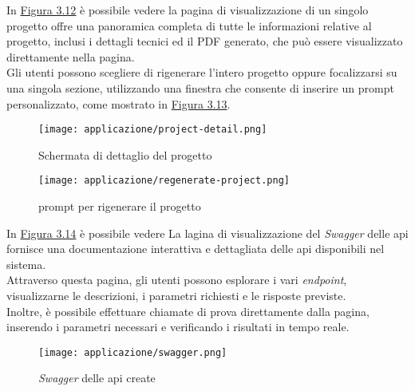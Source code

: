 \pagebreak
\noindent In {\hyperref[fig:project-detail]{Figura 3.12}} è possibile vedere la pagina di visualizzazione di un singolo progetto offre una panoramica completa di tutte le informazioni relative al progetto, inclusi i dettagli tecnici ed il PDF generato, che può essere visualizzato direttamente nella pagina. \\ 
Gli utenti possono scegliere di rigenerare l’intero progetto oppure focalizzarsi su una singola sezione, utilizzando una finestra che consente di inserire un \gls{prompt} personalizzato, come mostrato in {\hyperref[fig:regenerate-project]{Figura 3.13}}.\\
\begin{figure}[H]
    \centering
    \texttt{[image: applicazione/project-detail.png]}
    \caption{Schermata di dettaglio del progetto}
    \label{fig:project-detail}
\end{figure}

\begin{figure}[H]
    \centering
    \texttt{[image: applicazione/regenerate-project.png]}
    \caption{\gls{prompt} per rigenerare il progetto}
    \label{fig:regenerate-project}
\end{figure}

\pagebreak
\noindent In {\hyperref[fig:swagger]{Figura 3.14}} è possibile vedere La lagina di visualizzazione del \textit{Swagger} delle \gls{api} fornisce una documentazione interattiva e dettagliata delle \gls{api} disponibili nel sistema. \\
Attraverso questa pagina, gli utenti possono esplorare i vari \textit{endpoint}, visualizzarne le descrizioni, i parametri richiesti e le risposte previste. \\
Inoltre, è possibile effettuare chiamate di prova direttamente dalla pagina, inserendo i parametri necessari e verificando i risultati in tempo reale. 
\begin{figure}[H]
    \centering
    \texttt{[image: applicazione/swagger.png]}
    \caption{\textit{Swagger} delle \gls{api} create}
    \label{fig:swagger}
\end{figure}